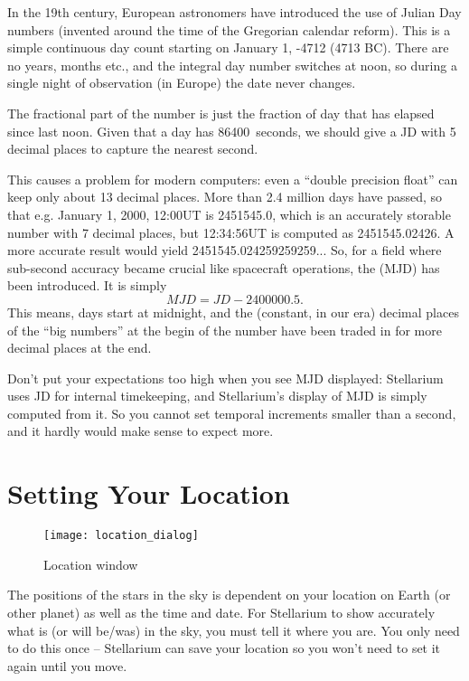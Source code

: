 In the 19th century, European astronomers have introduced the use of
Julian Day numbers (invented around the time of the Gregorian calendar
reform). This is a simple continuous day count starting on January 1, -4712
(4713 BC). There are no years, months etc., and the integral day
number switches at noon, so during a single night of observation (in
Europe) the date never changes. 

The fractional part of the number is just the fraction of day that has
elapsed since last noon. Given that a day has 86400~seconds, we should
give a JD with 5 decimal places to capture the nearest second.

This causes a problem for modern computers: even a ``double precision
float'' can keep only about 13 decimal places. More than 2.4 million
days have passed, so that e.g. January 1, 2000, 12:00UT is 2451545.0,
which is an accurately storable number with 7 decimal places, but 12:34:56UT is computed as
2451545.02426. A more accurate result would yield
2451545.024259259259... So, for a field where sub-second accuracy
became crucial like spacecraft operations, the  (MJD) has been introduced. It is simply
\begin{equation}
  \label{eq:MJD}
  MJD=JD-2400000.5. 
\end{equation}
This means, days start at midnight, and the (constant, in our era)
decimal places of the ``big numbers'' at the begin of the number have
been traded in for more decimal places at the end. 

Don't put your expectations too high when you see MJD displayed:
Stellarium uses JD for internal timekeeping, and Stellarium's display
of MJD is simply computed from it. So you cannot set temporal
increments smaller than a second, and it hardly would make sense to
expect more.

\section{Setting Your Location}
\label{sec:gui:location}

\begin{figure}[htb]
\centering\texttt{[image: location\_dialog]}
\caption{Location window}
\label{fig:gui:location}
\end{figure}

The positions of the stars in the sky is dependent on your location on
Earth (or other planet) as well as the time and date. For Stellarium to
show accurately what is (or will be/was) in the sky, you must tell it
where you are. You only need to do this once -- Stellarium can save your
location so you won't need to set it again until you move.

